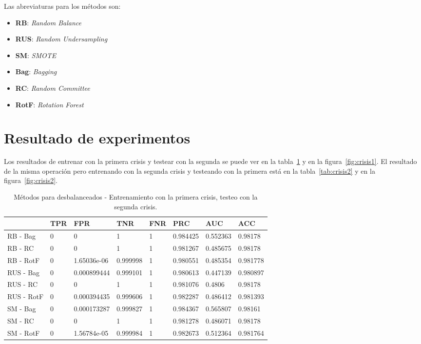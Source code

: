 \documentclass[a4paper,12pt,twoside,oldfontcommands]{memoir}
\begin{document}
	Las abreviaturas para los métodos son:
	
	\begin{itemize}
		\item \textbf{RB}: \textit{Random Balance}
		\item \textbf{RUS}: \textit{Random Undersampling}
		\item \textbf{SM}: \textit{SMOTE}
		\item \textbf{Bag}: \textit{Bagging}
		\item \textbf{RC}: \textit{Random Committee}
		\item \textbf{RotF}: \textit{Rotation Forest}
	\end{itemize}
	
	\section{Resultado de experimentos}
	
	Los resultados de entrenar con la primera crisis y testear con la segunda se puede ver en la tabla~\ref{tab:crisis1} y en la figura~\ref{fig:crisis1}. El resultado de la misma operación pero entrenando con la segunda crisis y testeando con la primera está en la tabla~\ref{tab:crisis2} y en la figura~\ref{fig:crisis2}.
	
	\begin{table}\scriptsize
		\begin{center}
			\begin{tabular}{llllllll}
				\toprule
				{} & TPR &          FPR &       TNR & FNR &       PRC &       AUC &       ACC \\
				\midrule
				RB - Bag                &   0 &            0 &         1 &   1 &  0.984425 &  0.552363 &   0.98178 \\
				RB - RC       &   0 &            0 &         1 &   1 &  0.981267 &  0.485675 &   0.98178 \\
				RB - RotF        &   0 &  1.65036e-06 &  0.999998 &   1 &  0.980551 &  0.485354 &  0.981778 \\
				RUS - Bag          &   0 &  0.000899444 &  0.999101 &   1 &  0.980613 &  0.447139 &  0.980897 \\
				RUS - RC &   0 &            0 &         1 &   1 &  0.981076 &    0.4806 &   0.98178 \\
				RUS - RotF  &   0 &  0.000394435 &  0.999606 &   1 &  0.982287 &  0.486412 &  0.981393 \\
				SM - Bag                         &   0 &  0.000173287 &  0.999827 &   1 &  0.984367 &  0.565807 &   0.98161 \\
				SM - RC                &   0 &            0 &         1 &   1 &  0.981278 &  0.486071 &   0.98178 \\
				SM - RotF                 &   0 &  1.56784e-05 &  0.999984 &   1 &  0.982673 &  0.512364 &  0.981764 \\
				\bottomrule
			\end{tabular}
			\caption{Métodos para desbalanceados - Entrenamiento con la primera crisis, testeo con la segunda crisis.}
			\label{tab:crisis1}
		\end{center}
	\end{table}
	
\end{document}
